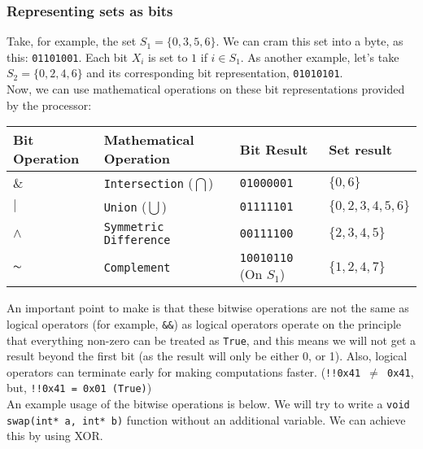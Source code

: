 \documentclass{article}
\newcommand{\ms}[1]{\texttt{#1}}
\begin{document}
\subsubsection{Representing sets as bits}

Take, for example, the set $S_1 = \{0,3,5,6\}$. We can cram this set into a byte, as this: \texttt{01101001}. Each bit $X_i$ is set to $1$ if $i \in S_1$. As another example, let's take $S_2 = \{0,2,4,6\}$ and its corresponding bit representation, \texttt{01010101}. \\

Now, we can use mathematical operations on these bit representations provided by the processor:

\begin{center}
\begin{table}[ht!]
\centering
\begin{tabular}{|l|l|l|l|}
\hline
Bit Operation & Mathematical Operation & Bit Result & Set result \\ \hline
\texttt{$\&$}                 & \ms{Intersection} ($\bigcap$)                                    & \ms{01000001}              & $\{0, 6\}$                    \\ \hline
\texttt{$|$}                 & \ms{Union} ($\bigcup$)                                    & \ms{01111101}              & $\{0,2,3,4,5,6\}$                   \\ \hline
\texttt{$\wedge$}                 & \ms{Symmetric Difference}                                   & \ms{00111100}             & $\{2,3,4,5\}$                   \\ \hline
\texttt{$\thicksim$}                & \ms{Complement}                                   & \ms{10010110} (On $S_1$)             & $\{1,2,4,7\}$                   \\ \hline
\end{tabular}
\end{table}
\end{center}

An important point to make is that these bitwise operations are not the same as logical operators (for example, \ms{\&\&}) as logical operators operate on the principle that everything non-zero can be treated as \ms{True}, and this means we will not get a result beyond the first bit (as the result will only be either 0, or 1). Also, logical operators can terminate early for making computations faster. (\ms{!!0x41 $\neq$ 0x41}, but, \ms{!!0x41 = 0x01 (True)}) \\
An example usage of the bitwise operations is below. We will try to write a \ms{void swap(int* a, int* b)} function without an additional variable. We can achieve this by using XOR.
\end{document}

